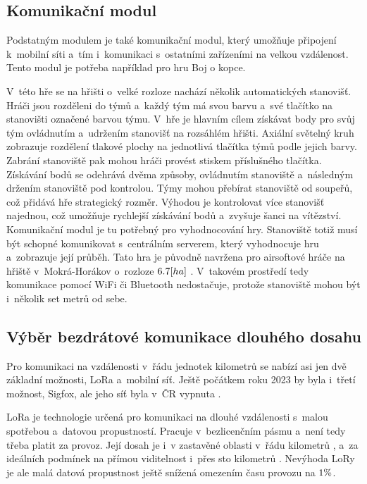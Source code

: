 \subsection{Komunikační modul \label{sec:KomunikacniModul}}
Podstatným modulem je také komunikační modul, který umožňuje připojení k~mobilní síti a~tím i~komunikaci s~ostatními zařízeními na velkou vzdálenost.
Tento modul je potřeba například pro hru Boj o kopce.

V~této hře se na hřišti o~velké rozloze nachází několik automatických stanovišť.
Hráči jsou rozděleni do týmů a~každý tým má svou barvu a~své tlačítko na stanovišti označené barvou týmu.
V~hře je hlavním cílem získávat body pro svůj tým ovládnutím a~udržením stanovišť na rozsáhlém hřišti. 
Axiální světelný kruh zobrazuje rozdělení tlakové plochy na jednotlivá tlačítka týmů podle jejich barvy.
Zabrání stanoviště pak mohou hráči provést stiskem příslušného tlačítka. 
Získávání bodů se odehrává dvěma způsoby, ovládnutím stanoviště a~následným držením stanoviště pod kontrolou. 
Týmy mohou přebírat stanoviště od soupeřů, což přidává hře strategický rozměr. 
Výhodou je kontrolovat více stanovišť najednou, což umožňuje rychlejší získávání bodů a~zvyšuje šanci na vítězství.
Komunikační modul je tu potřebný pro vyhodnocování hry.
Stanoviště totiž musí být schopné komunikovat s~centrálním serverem, který vyhodnocuje hru a~zobrazuje její průběh.
Tato hra je původně navržena pro airsoftové hráče na hřiště v~Mokrá-Horákov o~rozloze \(6.7\-[ha]\) \cite{MokraHorakov}.
V~takovém prostředí tedy komunikace pomocí WiFi či Bluetooth nedostačuje, protože stanoviště mohou být i~několik set metrů od sebe.

\subsection{Výběr bezdrátové komunikace dlouhého dosahu \label{sec:TypVzdaleneKomunikace}}
Pro komunikaci na vzdálenosti v~řádu jednotek kilometrů se nabízí asi jen dvě základní možnosti, LoRa a~mobilní síť.
Ještě počátkem roku 2023 by byla i~třetí možnost, Sigfox, ale jeho síť byla v~ČR vypnuta \cite{SigfoxKonci}.

LoRa je technologie určená pro komunikaci na dlouhé vzdálenosti s~malou spotřebou a~datovou propustností.
Pracuje v~bezlicenčním pásmu a~není tedy třeba platit za provoz.
Její dosah je i~v zastavěné oblasti v~řádu kilometrů \cite{LoRaSEMTECH}, a~za ideálních podmínek na přímou viditelnost i~přes sto kilometrů \cite{LoRaEMAN}. 
Nevýhoda LoRy je ale malá datová propustnost ještě snížená omezením času provozu na \(1\-\%\)\cite{LoRaEMAN}.

